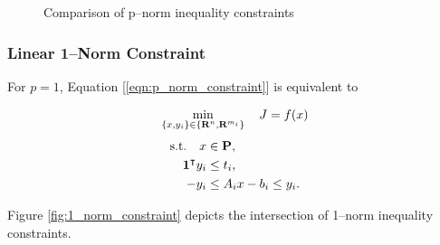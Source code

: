 \documentclass{article}
\begin{document}
    \begin{figure}[h!]
        \centering
        \qquad
        \qquad
        \caption{Comparison of p--norm inequality constraints}%
        \label{fig:LPvsQP}%
    \end{figure}

\subsubsection{Linear 1--Norm Constraint}

    For $p=1$, Equation [\ref{eqn:p_norm_constraint}] is equivalent to

    \begin{align*}
        \min_{\{x,y_i\}\in\{\textbf{R}^n,\textbf{R}^{m_i}\}} \quad J =f(x)
    \end{align*}
    \begin{align*}
        \text{s.t.}\quad x&\in\textbf{P},\\
        \textbf{1}^\intercal y_i&\leq t_i,\\
        -y_i&\leq A_ix-b_i\leq y_i.
    \end{align*}

    Figure \ref{fig:1_norm_constraint} depicts the intersection of 1--norm inequality constraints.
\end{document}
